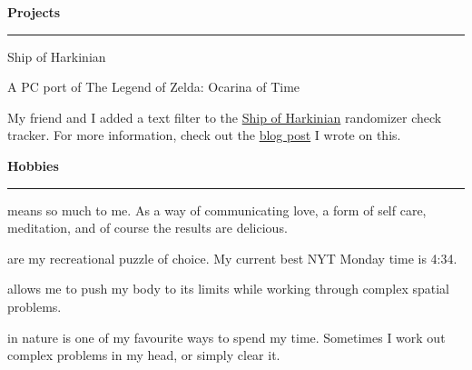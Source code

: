 \documentclass[letterpaper]{article}
\newcommand{\primary}{\color{primary}}
\newcommand{\primarydark}{\color{primarydark}}
\newcommand{\complementary}{\color{complementary}}
\newenvironment{heading}[1]{%
  {\LARGE \primarydark \textbf{#1}}\\ {\complementary
    \rule[5pt]{\linewidth}{0.6pt}}
}
{\par\vspace{8pt}}
\newcommand{\blockend}{\vspace{4pt}}
\newenvironment{project}[2]{%
  { #1 \par }
  { \small \primary #2 \par }%
}{
  \blockend{}
}
\newenvironment{prose}{\small}{\par}
\newcommand{\hobby}[2]{%
  {\small {\primarydark{#1}} #2} \par \vspace{2pt}
}
\begin{document}
\begin{minipage}[t]{0.39\textwidth}
\begin{heading}{Projects}
    \begin{project}{Ship of Harkinian}
      {A PC port of The Legend of Zelda: Ocarina of Time}%
      \begin{prose}
        My friend and I added a text filter to the
        \href{https://www.shipofharkinian.com/}{Ship of Harkinian} randomizer
        check tracker. For more information, check out the
        \href{https://michael.stergianis.ca/posts/adding-a-text-filter-to-the-ship-of-harkinian-randomizer-check-tracker/}{blog
          post} I wrote on this.
      \end{prose}
    \end{project}
  \end{heading}
  \begin{heading}{Hobbies}
    \hobby{Cooking}{means so much to me. As a way of communicating love, a form
      of self care, meditation, and of course the results are delicious.}

    \hobby{Crosswords}{are my recreational puzzle of choice. My current best NYT
      Monday time is 4:34.}

    \hobby{Bouldering}{allows me to push my body to its limits while working
      through complex spatial problems.}

    \hobby{Hiking}{in nature is one of my favourite ways to spend my time.
      Sometimes I work out complex problems in my head, or simply clear it.}
  \end{heading}
\end{minipage}
\end{document}
